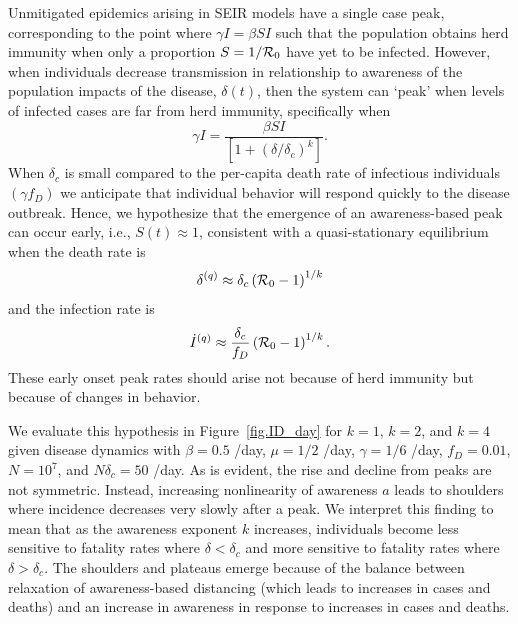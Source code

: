 Unmitigated epidemics arising in SEIR models have a single case peak, corresponding 
to the point where $\gamma I = \beta S I $ such that 
the population obtains herd immunity when only a proportion
$S=1/{\cal{R}}_0$ have yet to be infected.
However, when individuals decrease transmission in relationship
to awareness of the population impacts of the disease, $\delta(t)$,
then the system can `peak' when levels of infected cases are
far from herd immunity, specifically when
\begin{equation}
\gamma I = \frac{\beta SI}{\left[1+\left(\delta/\delta_c\right)^{k}\right]}.
\end{equation}
When $\delta_c$ is small compared to the per-capita death rate of infectious individuals $(\gamma f_D)$ we anticipate that individual behavior will respond quickly to the disease outbreak.
Hence, we hypothesize that the
emergence of an
awareness-based peak can occur early, i.e., $S(t)\approx 1$, consistent
with a quasi-stationary equilibrium when the death rate is
\begin{equation}
\delta^{(q)} \approx \delta_c\left({\cal{R}}_0-1\right)^{1/k}
\end{equation}
and the infection rate is
\begin{equation}
\dot{I}^{(q)} \approx \frac{\delta_c}{f_D}\left({\cal{R}}_0-1\right)^{1/k}.
\end{equation}
These early onset peak rates should arise not because
of herd immunity but because of changes in behavior. 

We evaluate this hypothesis in
Figure~\ref{fig.ID_day} for $k=1$, $k=2$, and $k=4$
given disease dynamics with $\beta=0.5$ /day, $\mu=1/2$ /day, $\gamma=1/6$
/day,
$f_D=0.01$, $N=10^7$, and $N\delta_c=50$ /day.  
As is evident, the rise and decline from peaks are not symmetric. Instead,
increasing nonlinearity of awareness
$a$ leads to shoulders where incidence decreases very slowly after a peak.
We interpret this finding to mean that as the awareness exponent $k$ increases,
individuals become less sensitive to fatality rates
where $\delta < \delta_c$ and more sensitive to fatality rates where $\delta > \delta_c$.  
The shoulders and plateaus emerge because of the balance
between relaxation of awareness-based
distancing (which leads to increases in cases and deaths) and an 
increase in awareness in response to increases in cases and deaths.  

